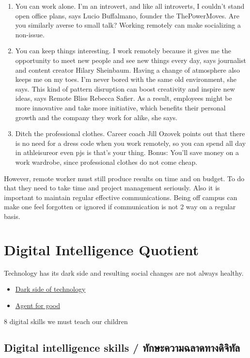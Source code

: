 \documentclass[]{book}
\providecommand{\tightlist}{%
  \setlength{\itemsep}{0pt}\setlength{\parskip}{0pt}}
\newcommand{\taibf}{\fontspec[Scale=1.3]{[THSarabunNew Bold.ttf:script=thai]}}
\begin{document}
\begin{enumerate}
\item
  You can work alone. I'm an introvert, and like all introverts, I couldn't stand open office plans, says Lucio Buffalmano, founder the ThePowerMoves. Are you similarly averse to small talk? Working remotely can make socializing a non-issue.
\item
  You can keep things interesting. I work remotely because it gives me the opportunity to meet new people and see new things every day, says journalist and content creator Hilary Sheinbaum. Having a change of atmosphere also keeps me on my toes. I'm never bored with the same old environment, she says. This kind of pattern disruption can boost creativity and inspire new ideas, says Remote Bliss Rebecca Safier. As a result, employees might be more innovative and take more initiative, which benefits their personal growth and the company they work for alike, she says.
\item
  Ditch the professional clothes.
  Career coach Jill Ozovek points out that there is no need for a dress code when you work remotely, so you can spend all day in athleisureor even pjs is that's your thing. Bonus: You'll save money on a work wardrobe, since professional clothes do not come cheap.
\end{enumerate}

However, remote worker must still produce results on time and on budget. To do that they need to take time and project management seriously. Also it is important to maintain regular effective communications. Being off campus can make one feel forgotten or ignored if communication is not 2 way on a regular basis.

\hypertarget{digital-intelligence-quotient}{%
\section{Digital Intelligence Quotient}\label{digital-intelligence-quotient}}

Technology has its dark side and resulting social changes are not always healthy.

\begin{itemize}
\tightlist
\item
  \href{https://youtu.be/J7cYcesGLcY}{Dark side of technology}
\item
  \href{}{Agent for good}
\end{itemize}

8 digital skills we must teach our children

\hypertarget{digital-intelligence-skills-}{%
\subsection{\texorpdfstring{Digital intelligence skills / \taibf ทักษะความฉลาดทางดิจิทัล}{Digital intelligence skills / ทักษะความฉลาดทางดิจิทัล}}\label{digital-intelligence-skills-}}
\end{document}

